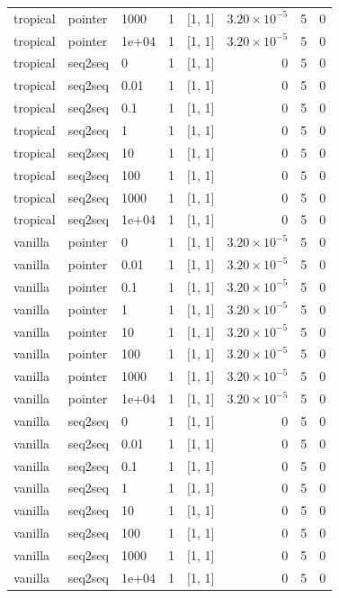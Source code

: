 \documentclass[10pt]{article}
\begin{document}
{\begin{longtable}{lllrlrrr}
tropical & pointer & 1000 & 1 & [1, 1] & $3.20\times10^{-5}$ & 5 & 0\\
tropical & pointer & 1e+04 & 1 & [1, 1] & $3.20\times10^{-5}$ & 5 & 0\\
tropical & seq2seq & 0 & 1 & [1, 1] & 0 & 5 & 0\\
tropical & seq2seq & 0.01 & 1 & [1, 1] & 0 & 5 & 0\\
tropical & seq2seq & 0.1 & 1 & [1, 1] & 0 & 5 & 0\\
tropical & seq2seq & 1 & 1 & [1, 1] & 0 & 5 & 0\\
tropical & seq2seq & 10 & 1 & [1, 1] & 0 & 5 & 0\\
tropical & seq2seq & 100 & 1 & [1, 1] & 0 & 5 & 0\\
tropical & seq2seq & 1000 & 1 & [1, 1] & 0 & 5 & 0\\
tropical & seq2seq & 1e+04 & 1 & [1, 1] & 0 & 5 & 0\\
vanilla & pointer & 0 & 1 & [1, 1] & $3.20\times10^{-5}$ & 5 & 0\\
vanilla & pointer & 0.01 & 1 & [1, 1] & $3.20\times10^{-5}$ & 5 & 0\\
vanilla & pointer & 0.1 & 1 & [1, 1] & $3.20\times10^{-5}$ & 5 & 0\\
vanilla & pointer & 1 & 1 & [1, 1] & $3.20\times10^{-5}$ & 5 & 0\\
vanilla & pointer & 10 & 1 & [1, 1] & $3.20\times10^{-5}$ & 5 & 0\\
vanilla & pointer & 100 & 1 & [1, 1] & $3.20\times10^{-5}$ & 5 & 0\\
vanilla & pointer & 1000 & 1 & [1, 1] & $3.20\times10^{-5}$ & 5 & 0\\
vanilla & pointer & 1e+04 & 1 & [1, 1] & $3.20\times10^{-5}$ & 5 & 0\\
vanilla & seq2seq & 0 & 1 & [1, 1] & 0 & 5 & 0\\
vanilla & seq2seq & 0.01 & 1 & [1, 1] & 0 & 5 & 0\\
vanilla & seq2seq & 0.1 & 1 & [1, 1] & 0 & 5 & 0\\
vanilla & seq2seq & 1 & 1 & [1, 1] & 0 & 5 & 0\\
vanilla & seq2seq & 10 & 1 & [1, 1] & 0 & 5 & 0\\
vanilla & seq2seq & 100 & 1 & [1, 1] & 0 & 5 & 0\\
vanilla & seq2seq & 1000 & 1 & [1, 1] & 0 & 5 & 0\\
vanilla & seq2seq & 1e+04 & 1 & [1, 1] & 0 & 5 & 0\\
\bottomrule
\end{longtable}
}
\end{document}
